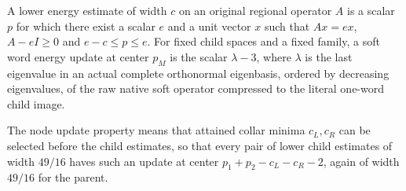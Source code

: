 \begin{definition}
    \label{def:soft_word_energy_update}
    \leanok
    A lower energy estimate of width $c$ on an original regional operator
    $A$ is a scalar $p$ for which there exist a scalar $e$ and a unit
    vector $x$ such that $Ax=ex$, $A-eI\ge0$ and $e-c\le p\le e$.
    For fixed child spaces and a fixed family, a soft word energy update
    at center $p_M$ is the scalar $\lambda-3$, where $\lambda$ is the
    last eigenvalue in an actual complete orthonormal eigenbasis, ordered
    by decreasing eigenvalues, of the raw native soft operator compressed
    to the literal one-word child image.

    The node update property means that attained collar minima $c_L,c_R$
    can be selected before the child estimates, so that every pair of
    lower child estimates of width $49/16$ haves such an update at center
    $p_1+p_2-c_L-c_R-2$, again of width $49/16$ for the parent.
\end{definition}

